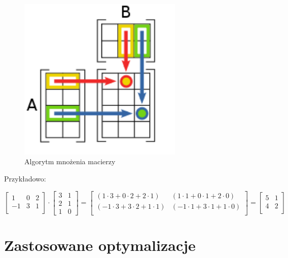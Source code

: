\documentclass[a4paper,12pt,oneside]{article}
\begin{document}
\begin{figure}[H]
  \caption{Algorytm mnożenia macierzy}
  \centering
    \includegraphics[width=0.7\textwidth]{matrix}
\end{figure}

Przykładowo:

\begin{equation}
\begin{bmatrix}
    1 & 0 & 2 \\
    -1 & 3 & 1 \\
  \end{bmatrix}
\cdot
  \begin{bmatrix}
    3 & 1 \\
    2 & 1 \\
    1 & 0
  \end{bmatrix}
=
  \begin{bmatrix}
     (1 \cdot 3  +  0 \cdot 2  +  2 \cdot 1) & (1 \cdot 1   +   0 \cdot 1   +   2 \cdot 0) \\
    (-1 \cdot 3  +  3 \cdot 2  +  1 \cdot 1) & (-1 \cdot 1   +   3 \cdot 1   +   1 \cdot 0) \\
  \end{bmatrix}
=
  \begin{bmatrix}
    5 & 1 \\
    4 & 2 \\
  \end{bmatrix}
\end{equation}
\section{Zastosowane optymalizacje}
\end{document}
